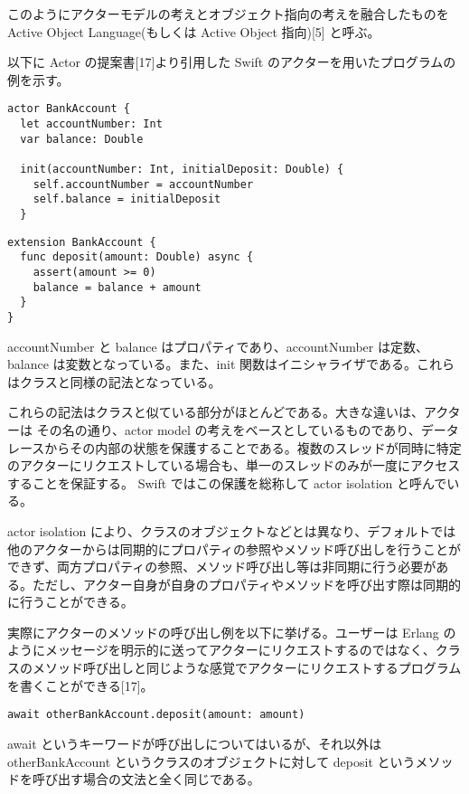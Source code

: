 このようにアクターモデルの考えとオブジェクト指向の考えを融合したものを
Active Object Language(もしくは Active Object 指向){[}5{]} と呼ぶ。

以下に Actor の提案書{[}17{]}より引用した Swift
のアクターを用いたプログラムの例を示す。

\begin{verbatim}
actor BankAccount {
  let accountNumber: Int
  var balance: Double

  init(accountNumber: Int, initialDeposit: Double) {
    self.accountNumber = accountNumber
    self.balance = initialDeposit
  }
\end{verbatim}

\begin{verbatim}
extension BankAccount {
  func deposit(amount: Double) async {
    assert(amount >= 0)
    balance = balance + amount
  }
}
\end{verbatim}

accountNumber と balance はプロパティであり、accountNumber
は定数、balance は変数となっている。また、init
関数はイニシャライザである。これらはクラスと同様の記法となっている。

これらの記法はクラスと似ている部分がほとんどである。大きな違いは、アクターは
その名の通り、actor model
の考えをベースとしているものであり、データレースからその内部の状態を保護することである。複数のスレッドが同時に特定のアクターにリクエストしている場合も、単一のスレッドのみが一度にアクセスすることを保証する。
Swift ではこの保護を総称して actor isolation と呼んでいる。

actor isolation
により、クラスのオブジェクトなどとは異なり、デフォルトでは他のアクターからは同期的にプロパティの参照やメソッド呼び出しを行うことができず、両方プロパティの参照、メソッド呼び出し等は非同期に行う必要がある。ただし、アクター自身が自身のプロパティやメソッドを呼び出す際は同期的に行うことができる。

実際にアクターのメソッドの呼び出し例を以下に挙げる。ユーザーは Erlang
のようにメッセージを明示的に送ってアクターにリクエストするのではなく、クラスのメソッド呼び出しと同じような感覚でアクターにリクエストするプログラムを書くことができる{[}17{]}。

\begin{verbatim}
await otherBankAccount.deposit(amount: amount)
\end{verbatim}

await というキーワードが呼び出しについてはいるが、それ以外は
otherBankAccount というクラスのオブジェクトに対して deposit
というメソッドを呼び出す場合の文法と全く同じである。

